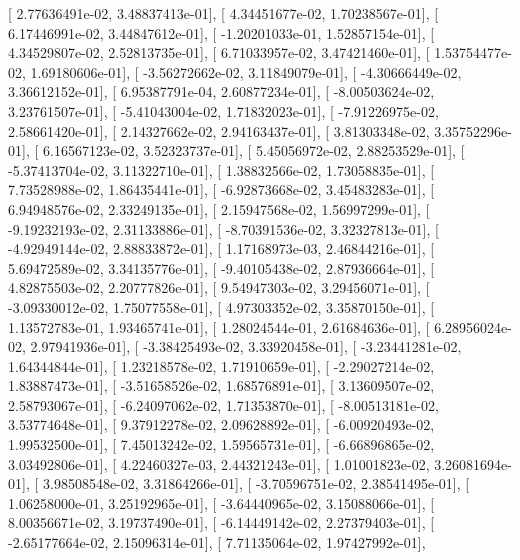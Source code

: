 \documentclass{article}
\begin{document}
       [  2.77636491e-02,   3.48837413e-01],
       [  4.34451677e-02,   1.70238567e-01],
       [  6.17446991e-02,   3.44847612e-01],
       [ -1.20201033e-01,   1.52857154e-01],
       [  4.34529807e-02,   2.52813735e-01],
       [  6.71033957e-02,   3.47421460e-01],
       [  1.53754477e-02,   1.69180606e-01],
       [ -3.56272662e-02,   3.11849079e-01],
       [ -4.30666449e-02,   3.36612152e-01],
       [  6.95387791e-04,   2.60877234e-01],
       [ -8.00503624e-02,   3.23761507e-01],
       [ -5.41043004e-02,   1.71832023e-01],
       [ -7.91226975e-02,   2.58661420e-01],
       [  2.14327662e-02,   2.94163437e-01],
       [  3.81303348e-02,   3.35752296e-01],
       [  6.16567123e-02,   3.52323737e-01],
       [  5.45056972e-02,   2.88253529e-01],
       [ -5.37413704e-02,   3.11322710e-01],
       [  1.38832566e-02,   1.73058835e-01],
       [  7.73528988e-02,   1.86435441e-01],
       [ -6.92873668e-02,   3.45483283e-01],
       [  6.94948576e-02,   2.33249135e-01],
       [  2.15947568e-02,   1.56997299e-01],
       [ -9.19232193e-02,   2.31133886e-01],
       [ -8.70391536e-02,   3.32327813e-01],
       [ -4.92949144e-02,   2.88833872e-01],
       [  1.17168973e-03,   2.46844216e-01],
       [  5.69472589e-02,   3.34135776e-01],
       [ -9.40105438e-02,   2.87936664e-01],
       [  4.82875503e-02,   2.20777826e-01],
       [  9.54947303e-02,   3.29456071e-01],
       [ -3.09330012e-02,   1.75077558e-01],
       [  4.97303352e-02,   3.35870150e-01],
       [  1.13572783e-01,   1.93465741e-01],
       [  1.28024544e-01,   2.61684636e-01],
       [  6.28956024e-02,   2.97941936e-01],
       [ -3.38425493e-02,   3.33920458e-01],
       [ -3.23441281e-02,   1.64344844e-01],
       [  1.23218578e-02,   1.71910659e-01],
       [ -2.29027214e-02,   1.83887473e-01],
       [ -3.51658526e-02,   1.68576891e-01],
       [  3.13609507e-02,   2.58793067e-01],
       [ -6.24097062e-02,   1.71353870e-01],
       [ -8.00513181e-02,   3.53774648e-01],
       [  9.37912278e-02,   2.09628892e-01],
       [ -6.00920493e-02,   1.99532500e-01],
       [  7.45013242e-02,   1.59565731e-01],
       [ -6.66896865e-02,   3.03492806e-01],
       [  4.22460327e-03,   2.44321243e-01],
       [  1.01001823e-02,   3.26081694e-01],
       [  3.98508548e-02,   3.31864266e-01],
       [ -3.70596751e-02,   2.38541495e-01],
       [  1.06258000e-01,   3.25192965e-01],
       [ -3.64440965e-02,   3.15088066e-01],
       [  8.00356671e-02,   3.19737490e-01],
       [ -6.14449142e-02,   2.27379403e-01],
       [ -2.65177664e-02,   2.15096314e-01],
       [  7.71135064e-02,   1.97427992e-01],
\end{document}
